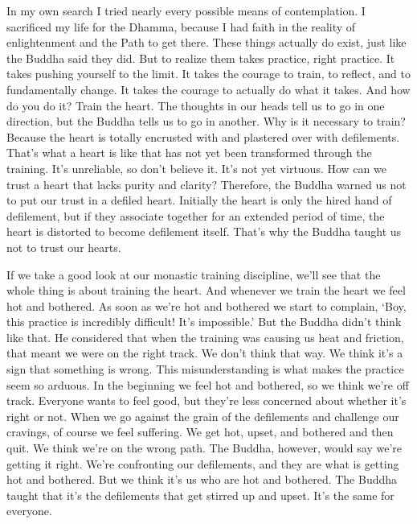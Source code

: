 In my own search I tried nearly every possible means of contemplation. I sacrificed my life for the Dhamma, because I had faith in the reality of enlightenment and the Path to get there. These things actually do exist, just like the Buddha said they did. But to realize them takes practice, right practice. It takes pushing yourself to the limit. It takes the courage to train, to reflect, and to fundamentally change. It takes the courage to actually do what it takes. And how do you do it? Train the heart. The thoughts in our heads tell us to go in one direction, but the Buddha tells us to go in another. Why is it necessary to train? Because the heart is totally encrusted with and plastered over with defilements. That's what a heart is like that has not yet been transformed through the training. It's unreliable, so don't believe it. It's not yet virtuous. How can we trust a heart that lacks purity and clarity? Therefore, the Buddha warned us not to put our trust in a defiled heart. Initially the heart is only the hired hand of defilement, but if they associate together for an extended period of time, the heart is distorted to become defilement itself. That's why the Buddha taught us not to trust our hearts.

If we take a good look at our monastic training discipline, we'll see that the whole thing is about training the heart. And whenever we train the heart we feel hot and bothered. As soon as we're hot and bothered we start to complain, `Boy, this practice is incredibly difficult! It's impossible.' But the Buddha didn't think like that. He considered that when the training was causing us heat and friction, that meant we were on the right track. We don't think that way. We think it's a sign that something is wrong. This misunderstanding is what makes the practice seem so arduous. In the beginning we feel hot and bothered, so we think we're off track. Everyone wants to feel good, but they're less concerned about whether it's right or not. When we go against the grain of the defilements and challenge our cravings, of course we feel suffering. We get hot, upset, and bothered and then quit. We think we're on the wrong path. The Buddha, however, would say we're getting it right. We're confronting our defilements, and they are what is getting hot and bothered. But we think it's us who are hot and bothered. The Buddha taught that it's the defilements that get stirred up and upset. It's the same for everyone.

